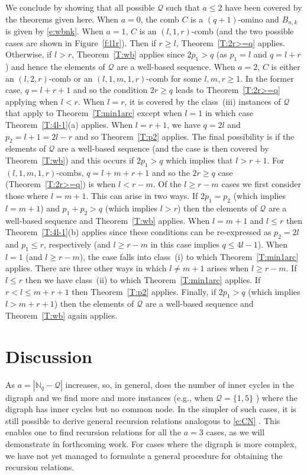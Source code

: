 \documentclass[preprint,3p]{elsarticle}
\newcommand{\abs}[1]{\left\lvert#1\right\rvert}
\providecommand{\Nset}{\mathbb{N}}
\begin{document}
We conclude by showing that all possible $\mathcal{Q}$ such
that $a\leq2$ have been covered by the theorems given here. When
$a=0$, the comb $C$ is a $(q+1)$-omino and $B_{n,k}$ is given by
\eqref{e:wbnk}. When $a=1$, $C$ is an $(l,1,r)$-comb (and the two
possible cases are shown in Figure~\ref{f:l1r}).  Then if $r\geq l$,
Theorem~\ref{T:2r>=q} applies. Otherwise, if $l>r$, Theorem~\ref{T:wb}
applies since $2p_1>q$ (as $p_1=l$ and $q=l+r$) and hence the elements
of $\mathcal{Q}$ are a well-based sequence.  When $a=2$, $C$ is either
an $(l,2,r)$-comb or an $(l,1,m,1,r)$-comb for some $l,m,r\geq1$. In
the former case, $q=l+r+1$ and so the condition $2r\geq q$ leads to
Theorem~\ref{T:2r>=q} applying when $l<r$. When $l=r$, it is covered
by the class~(iii) instances of $\mathcal{Q}$ that apply to
Theorem~\ref{T:min1arc} except when $l=1$ in which case
Theorem~\ref{T:4l-1}(a) applies. When $l=r+1$, we have $q=2l$ and
$p_2=l+1=2l-r$ and so Theorem~\ref{T:p2} applies. The final
possibility is if the elements of $\mathcal{Q}$ are a well-based
sequence (and the case is then covered by Theorem~\ref{T:wb}) and this
occurs if $2p_1>q$ which implies that $l>r+1$. For
$(l,1,m,1,r)$-combs, $q=l+m+r+1$ and so the $2r\geq q$ case
(Theorem~\ref{T:2r>=q}) is when $l<r-m$. Of the $l\geq r-m$ cases we
first consider those where $l=m+1$. This can arise in two ways. If
$2p_1=p_2$ (which implies $l=m+1$) and $p_1+p_2>q$ (which implies
$l>r$) then the elements of $\mathcal{Q}$ are a well-based sequence
and Theorem~\ref{T:wb} applies. When $l=m+1$ and $l\leq r$ then
Theorem~\ref{T:4l-1}(b) applies since these conditions can be
re-expressed as $p_2=2l$ and $p_1\leq r$, respectively (and $l\geq
r-m$ in this case implies $q\leq4l-1$). When $l=1$
(and $l\geq r-m$), the case falls into class~(i) to which
Theorem~\ref{T:min1arc} applies. There are three other ways in which
$l\neq m+1$ arises when $l\geq r-m$. If $l\leq r$ then we have
class~(ii) to which Theorem~\ref{T:min1arc} applies. If $r<l\leq
m+r+1$ then Theorem~\ref{T:p2} applies. Finally, if $2p_1>q$ (which
implies $l>m+r+1$) then the elements of $\mathcal{Q}$ are a well-based
sequence and Theorem~\ref{T:wb} again applies.

\section{Discussion}

As $a=\abs{\Nset_q-\mathcal{Q}}$ increases, so, in general, does the
number of inner cycles in the digraph and we find more and more
instances (e.g., when $\mathcal{Q}=\{1,5\}$ \cite{All-ConnComb}) where
the digraph has inner cycles but no common node. In the simpler of
such cases, it is still possible to derive general recursion relations
analogous to \eqref{e:CN} \cite{All22}. This enables one to find
recursion relations for all the $a=3$ cases, as we will demonstrate in
forthcoming work. For cases where the digraph is more complex, we have
not yet managed to formulate a general procedure for obtaining the
recursion relations.
\end{document}
